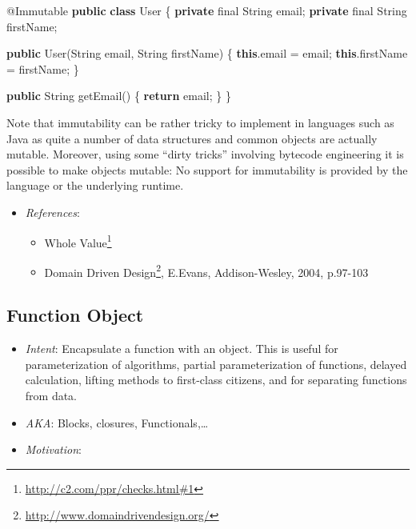 \documentclass[11pt,]{article}
\newenvironment{Shaded}{}{}
\newcommand{\KeywordTok}[1]{\textcolor[rgb]{0.00,0.44,0.13}{\textbf{{#1}}}}
\newcommand{\DataTypeTok}[1]{\textcolor[rgb]{0.56,0.13,0.00}{{#1}}}
\newcommand{\FunctionTok}[1]{\textcolor[rgb]{0.02,0.16,0.49}{{#1}}}
\newcommand{\NormalTok}[1]{{#1}}
\renewcommand{\href}[2]{#2\footnote{\url{#1}}}
\begin{document}
\begin{Shaded}
\begin{Highlighting}[]
\NormalTok{@Immutable}
\KeywordTok{public} \KeywordTok{class} \NormalTok{User \{}
  \KeywordTok{private} \DataTypeTok{final} \NormalTok{String email;}
  \KeywordTok{private} \DataTypeTok{final} \NormalTok{String firstName;}
  
  \KeywordTok{public} \FunctionTok{User}\NormalTok{(String email, String firstName) \{}
    \KeywordTok{this}\NormalTok{.}\FunctionTok{email} \NormalTok{= email;}
    \KeywordTok{this}\NormalTok{.}\FunctionTok{firstName} \NormalTok{= firstName;}
  \NormalTok{\}}
  
  \KeywordTok{public} \NormalTok{String }\FunctionTok{getEmail}\NormalTok{() \{}
    \KeywordTok{return} \NormalTok{email;}
  \NormalTok{\}}
\NormalTok{\}}
\end{Highlighting}
\end{Shaded}

Note that immutability can be rather tricky to implement in languages
such as Java as quite a number of data structures and common objects are
actually mutable. Moreover, using some ``dirty tricks'' involving
bytecode engineering it is possible to make objects mutable: No support
for immutability is provided by the language or the underlying runtime.

\begin{itemize}
\item
  \emph{References}:

  \begin{itemize}
  \item
    \href{http://c2.com/ppr/checks.html\#1}{Whole Value}
  \item
    \href{http://www.domaindrivendesign.org/}{Domain Driven Design},
    E.Evans, Addison-Wesley, 2004, p.97-103
  \end{itemize}
\end{itemize}

\subsection{Function Object}

\begin{itemize}
\item
  \emph{Intent}: Encapsulate a function with an object. This is useful
  for parameterization of algorithms, partial parameterization of
  functions, delayed calculation, lifting methods to first-class
  citizens, and for separating functions from data.
\item
  \emph{AKA}: Blocks, closures, Functionals,\ldots{}
\item
  \emph{Motivation}:
\end{itemize}
\end{document}

